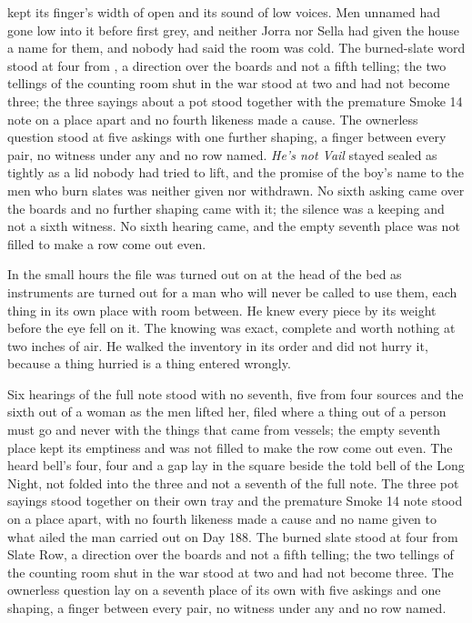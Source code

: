  kept its finger's width of open and its sound of low voices. Men unnamed had gone low into it before first grey, and neither Jorra nor Sella had given the house a name for them, and nobody had said the room was cold. The burned-slate word stood at four from , a direction over the boards and not a fifth telling; the two tellings of the counting room shut in the war stood at two and had not become three; the three sayings about a pot stood together with the premature Smoke 14 note on a place apart and no fourth likeness made a cause. The ownerless question stood at five askings with one further shaping, a finger between every pair, no witness under any and no row named. \emph{He's not Vail} stayed sealed as tightly as a lid nobody had tried to lift, and the promise of the boy's name to the men who burn slates was neither given nor withdrawn. No sixth asking came over the boards and no further shaping came with it; the silence was a keeping and not a sixth witness. No sixth hearing came, and the empty seventh place was not filled to make a row come out even.

In the small hours the file was turned out on  at the head of the bed as instruments are turned out for a man who will never be called to use them, each thing in its own place with room between. He knew every piece by its weight before the eye fell on it. The knowing was exact, complete and worth nothing at two inches of air. He walked the inventory in its order and did not hurry it, because a thing hurried is a thing entered wrongly.

Six hearings of the full note stood with no seventh, five from four sources and the sixth out of a woman as the men lifted her, filed where a thing out of a person must go and never with the things that came from vessels; the empty seventh place kept its emptiness and was not filled to make the row come out even. The heard bell's four, four and a gap lay in the square beside the told bell of the Long Night, not folded into the three and not a seventh of the full note. The three pot sayings stood together on their own tray and the premature Smoke 14 note stood on a place apart, with no fourth likeness made a cause and no name given to what ailed the man carried out on Day 188. The burned slate stood at four from Slate Row, a direction over the boards and not a fifth telling; the two tellings of the counting room shut in the war stood at two and had not become three. The ownerless question lay on a seventh place of its own with five askings and one shaping, a finger between every pair, no witness under any and no row named.

